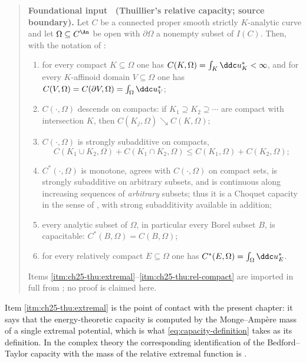 \label{thm:ch25-thuillier-capacity}
\begin{quote}
\textbf{Foundational input \thetheorem\ (Thuillier's relative capacity;
source boundary).}
Let \(C\) be a connected proper smooth strictly \(K\)-analytic curve and let
\(\Omega\subseteq C^{\An}\) be open with \(\partial\Omega\) a nonempty
subset of \(I(C)\).  Then, with the notation of
:
\begin{enumerate}
\item\label{itm:ch25-thu:extremal}
 for every compact \(K\subseteq\Omega\) one has
 \(C(K,\Omega)=\int_K\ddc u^*_K<\infty\), and for every \(K\)-affinoid
 domain \(V\subseteq\Omega\) one has
 \(C(V,\Omega)=C(\partial V,\Omega)=\int_\Omega\ddc u^*_V\);
\item\label{itm:ch25-thu:descend}
 \(C(\cdot,\Omega)\) descends on compacts: if \(K_1\supseteq K_2\supseteq
 \cdots\) are compact with intersection \(K\), then
 \(C(K_j,\Omega)\searrow C(K,\Omega)\);
\item\label{itm:ch25-thu:strong}
 \(C(\cdot,\Omega)\) is strongly subadditive on compacts,
 \[
  C(K_1\cup K_2,\Omega)+C(K_1\cap K_2,\Omega)
  \leq C(K_1,\Omega)+C(K_2,\Omega);
 \]
\item\label{itm:ch25-thu:outer}
 \(C^*(\cdot,\Omega)\) is monotone, agrees with \(C(\cdot,\Omega)\) on
 compact sets, is strongly subadditive on arbitrary subsets, and is
 continuous along increasing sequences of \emph{arbitrary} subsets; thus it
 is a Choquet capacity in the sense of , with
 strong subadditivity available in addition;
\item\label{itm:ch25-thu:capacitable}
 every analytic subset of \(\Omega\), in particular every Borel subset
 \(B\), is capacitable: \(C^*(B,\Omega)=C(B,\Omega)\);
\item\label{itm:ch25-thu:rel-compact}
 for every relatively compact \(E\subseteq\Omega\) one has
 \(C^*(E,\Omega)=\int_\Omega\ddc u^*_E\).
\end{enumerate}
Items \cref{itm:ch25-thu:extremal}--\cref{itm:ch25-thu:rel-compact} are
imported in full from \cite[Propositions~3.6.3, 3.6.5, 3.6.6, 3.6.8,
3.6.10 and Th\'eor\`eme~3.6.9]{Thu05}; no proof is claimed here.
\end{quote}

Item \cref{itm:ch25-thu:extremal} is the point of contact with the present
chapter: it says that the energy-theoretic capacity is computed by the
Monge--Amp\`ere mass of a single extremal potential, which is what
\eqref{eq:capacity-definition} takes as its definition.  In the complex
theory the corresponding identification of the Bedford--Taylor capacity with
the mass of the relative extremal function is \cite[Proposition~4.2]{BT82}.

